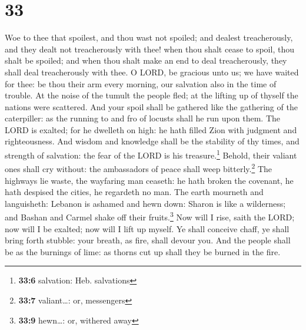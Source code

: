 \hypertarget{section-32}{%
\section{33}\label{section-32}}

 Woe to thee that spoilest, and thou wast not spoiled; and
dealest treacherously, and they dealt not treacherously with thee! when
thou shalt cease to spoil, thou shalt be spoiled; and when thou shalt
make an end to deal treacherously, they shall deal treacherously with
thee.  O LORD, be gracious unto us; we have waited for
thee: be thou their arm every morning, our salvation also in the time of
trouble.  At the noise of the tumult the people fled; at
the lifting up of thyself the nations were scattered.  And
your spoil shall be gathered like the gathering of the caterpiller: as
the running to and fro of locusts shall he run upon them. 
The LORD is exalted; for he dwelleth on high: he hath filled Zion with
judgment and righteousness.  And wisdom and knowledge
shall be the stability of thy times, and strength of salvation: the fear
of the LORD is his treasure.\footnote{\textbf{33:6} salvation: Heb.
  salvations}  Behold, their valiant ones shall cry
without: the ambassadors of peace shall weep bitterly.\footnote{\textbf{33:7}
  valiant\ldots: or, messengers}  The highways lie waste,
the wayfaring man ceaseth: he hath broken the covenant, he hath despised
the cities, he regardeth no man.  The earth mourneth and
languisheth: Lebanon is ashamed and hewn down: Sharon is like a
wilderness; and Bashan and Carmel shake off their fruits.\footnote{\textbf{33:9}
  hewn\ldots: or, withered away}  Now will I rise, saith
the LORD; now will I be exalted; now will I lift up myself.
 Ye shall conceive chaff, ye shall bring forth stubble:
your breath, as fire, shall devour you.  And the people
shall be as the burnings of lime: as thorns cut up shall they be burned
in the fire.

